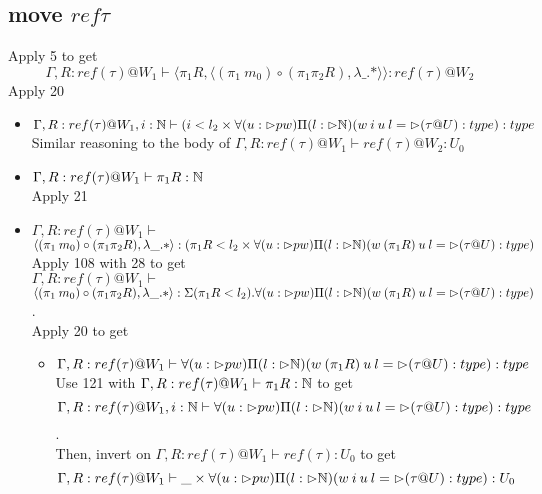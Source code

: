\documentclass{article}
\begin{document}
  \subsection*{move $ref \tau$}
Apply 5 to get 
\[\Gamma, R: ref(\tau) @ W_1 \vdash \langle \pi_1 R, \langle (\pi_1\: m_0) \circ (\pi_1 \pi_2 R),
\lambda \_. * \rangle \rangle: ref(\tau) @ W_2
\]
Apply 20
\begin{itemize}
\item $\Gamma, R: ref(\tau) @ W_1, i : \mathbb{N} \vdash (i < l_2 \times
\forall(u: \rhd pw)\Pi(l: \rhd \mathbb{N})(w \: i \: u \: l = \rhd (\tau @ U) : type): type $\\
Similar reasoning to the body of $\Gamma,  R: ref(\tau)@W_1 \vdash ref(\tau) @ W_2: U_0$
    \item $\Gamma, R: ref(\tau) @ W_1 \vdash \pi_1 R : \mathbb{N}$\\
    Apply 21
    \item $\Gamma, R: ref(\tau) @ W_1 \vdash $\\
    $\langle (\pi_1\: m_0) \circ (\pi_1 \pi_2 R),
\lambda \_. * \rangle: (\pi_1 R < l_2 \times
\forall(u: \rhd pw)\Pi(l: \rhd \mathbb{N})(w \: (\pi_1 R) \: u \: l = \rhd (\tau @ U) : type
) $\\
Apply 108 with 28 to get\\
$\Gamma, R: ref(\tau) @ W_1 \vdash$\\
$\langle (\pi_1\: m_0) \circ (\pi_1 \pi_2 R),
\lambda \_. * \rangle: \Sigma(\pi_1 R < l_2).
\forall(u: \rhd pw)\Pi(l: \rhd \mathbb{N})(w \: (\pi_1 R) \: u \: l = \rhd (\tau @ U) : type
) $.\\
Apply 20 to get 
\begin{itemize}
    \item $\Gamma, R: ref(\tau) @ W_1 \vdash \forall(u: \rhd pw)\Pi(l: \rhd \mathbb{N})(w \: (\pi_1 R) \: u \: l = \rhd (\tau @ U) : type): type$\\
Use 121 with $\Gamma, R:  ref(\tau) @ W_1 \vdash \pi_1 R: \mathbb{N}$ to get
\[\Gamma, R: ref(\tau) @ W_1, i: \mathbb{N} \vdash \forall(u: \rhd pw)\Pi(l: \rhd \mathbb{N})(w \: i \: u \: l = \rhd (\tau @ U) : type): type\].\\
Then, invert on $\Gamma, R: ref(\tau) @ W_1 \vdash ref(\tau) : U_0$ to get
\[\Gamma, R: ref(\tau) @ W_1 \vdash \_ \times \forall(u: \rhd pw)\Pi(l: \rhd \mathbb{N})(w \: i \: u \: l = \rhd (\tau @ U) : type) : U_0\]


\end{itemize}
\end{itemize}
\end{document}
